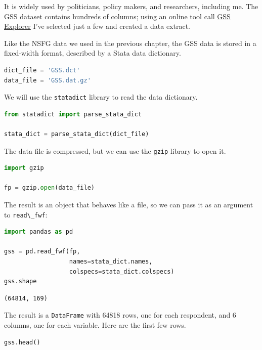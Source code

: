 It is widely used by politicians, policy makers, and researchers,
including me. The GSS dataset contains hundreds of columns; using an
online tool call \href{https://gssdataexplorer.norc.org/}{GSS Explorer}
I've selected just a few and created a data extract.

Like the NSFG data we used in the previous chapter, the GSS data is
stored in a fixed-width format, described by a Stata data dictionary.

\begin{lstlisting}[language=Python,style=source]
dict_file = 'GSS.dct'
data_file = 'GSS.dat.gz'
\end{lstlisting}

We will use the \passthrough{\lstinline!statadict!} library to read the
data dictionary.

\begin{lstlisting}[language=Python,style=source]
from statadict import parse_stata_dict

stata_dict = parse_stata_dict(dict_file)
\end{lstlisting}

The data file is compressed, but we can use the
\passthrough{\lstinline!gzip!} library to open it.

\begin{lstlisting}[language=Python,style=source]
import gzip

fp = gzip.open(data_file)
\end{lstlisting}

The result is an object that behaves like a file, so we can pass it as
an argument to \passthrough{\lstinline!read\_fwf!}:

\begin{lstlisting}[language=Python,style=source]
import pandas as pd

gss = pd.read_fwf(fp, 
                  names=stata_dict.names, 
                  colspecs=stata_dict.colspecs)
gss.shape
\end{lstlisting}

\begin{lstlisting}[style=output]
(64814, 169)
\end{lstlisting}

The result is a \passthrough{\lstinline!DataFrame!} with 64818 rows, one
for each respondent, and 6 columns, one for each variable. Here are the
first few rows.

\begin{lstlisting}[language=Python,style=source]
gss.head()
\end{lstlisting}

